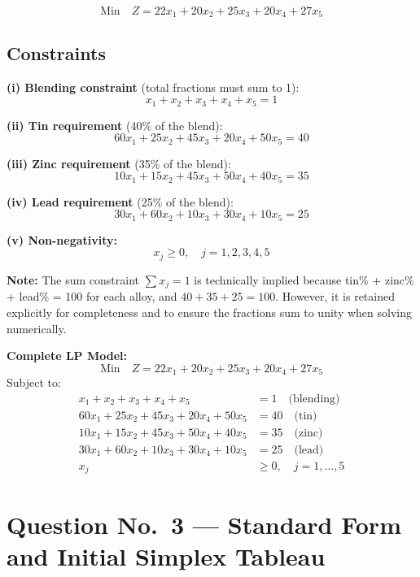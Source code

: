 \documentclass[12pt]{article}
\begin{document}
\[
  \text{Min}\quad Z = 22x_1 + 20x_2 + 25x_3 + 20x_4 + 27x_5
\]

\subsection*{Constraints}

\textbf{(i) Blending constraint} (total fractions must sum to 1):
\[
  x_1 + x_2 + x_3 + x_4 + x_5 = 1
\]

\textbf{(ii) Tin requirement} (40\% of the blend):
\[
  60x_1 + 25x_2 + 45x_3 + 20x_4 + 50x_5 = 40
\]

\textbf{(iii) Zinc requirement} (35\% of the blend):
\[
  10x_1 + 15x_2 + 45x_3 + 50x_4 + 40x_5 = 35
\]

\textbf{(iv) Lead requirement} (25\% of the blend):
\[
  30x_1 + 60x_2 + 10x_3 + 30x_4 + 10x_5 = 25
\]

\textbf{(v) Non-negativity:}
\[
  x_j \geq 0, \quad j = 1, 2, 3, 4, 5
\]

\begin{observebox}
\textbf{Note:} The sum constraint $\sum x_j = 1$ is technically implied because
tin\% + zinc\% + lead\% = 100 for each alloy, and $40 + 35 + 25 = 100$.
However, it is retained explicitly for completeness and to ensure the fractions
sum to unity when solving numerically.
\end{observebox}

\vspace{8pt}

\begin{formulabox}
\textbf{Complete LP Model:}\\[6pt]
\[
  \text{Min}\quad Z = 22x_1 + 20x_2 + 25x_3 + 20x_4 + 27x_5
\]
Subject to:
\begin{align*}
  x_1 + x_2 + x_3 + x_4 + x_5 &= 1 \quad\text{(blending)}\\
  60x_1 + 25x_2 + 45x_3 + 20x_4 + 50x_5 &= 40 \quad\text{(tin)}\\
  10x_1 + 15x_2 + 45x_3 + 50x_4 + 40x_5 &= 35 \quad\text{(zinc)}\\
  30x_1 + 60x_2 + 10x_3 + 30x_4 + 10x_5 &= 25 \quad\text{(lead)}\\
  x_j &\geq 0, \quad j = 1,\ldots,5
\end{align*}
\end{formulabox}

\newpage

\section{Question No.\ 3 --- Standard Form and Initial Simplex Tableau}
\end{document}
